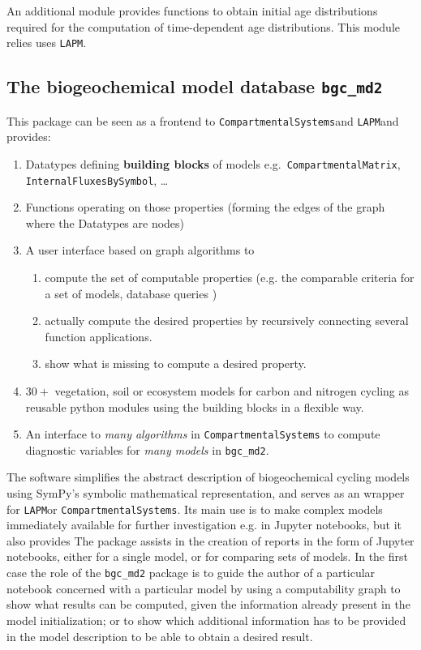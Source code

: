 \documentclass[a4paper]{article}
\newcommand{\LAPM}{\texttt{LAPM}}
\newcommand{\CompartmentalSystems}{\texttt{CompartmentalSystems}}
\begin{document}
An additional module provides functions to obtain initial age distributions
required for the computation of time-dependent age distributions. 
This module relies uses \LAPM.


\subsection{The biogeochemical model database \texttt{bgc\_md2}}
This package can be seen as a frontend to \CompartmentalSystems and \LAPM and
provides: 
  \begin{enumerate}
    \item
      Datatypes defining {\bf building blocks} of models e.g.\ \texttt{CompartmentalMatrix}, \texttt{InternalFluxesBySymbol}, \dots     
    \item
      Functions operating on those properties (forming the edges of the graph where the Datatypes are nodes) 
    \item
      A user interface based on graph algorithms to  
    \begin{enumerate}
      \item
        compute the set of computable properties (e.g. the comparable criteria for a set of models, database queries ) 
      \item
        actually compute the desired properties by recursively connecting several function applications.
      \item
        show what is missing to compute a desired property.
    \end{enumerate}
    \item
    $30+$ vegetation, soil or ecosystem models for carbon and nitrogen cycling
      as reusable python modules using the building blocks in a flexible way. 
    \item 
      An interface to \emph{many  algorithms} in \texttt{CompartmentalSystems} to compute diagnostic variables
      for \emph{many models} in \texttt{bgc\_md2}.
  \end{enumerate}
The software simplifies the abstract description of biogeochemical cycling
models using SymPy's symbolic mathematical representation, and serves as an
wrapper for \LAPM or \CompartmentalSystems.
Its main use is to make complex models immediately available for further investigation e.g. in Jupyter notebooks, but it also provides 
The package assists in the creation of reports in the form of Jupyter notebooks, either for a single model, or for comparing sets of models.
In the first case the role of the \texttt{bgc\_md2} package is to guide the author of a particular notebook concerned with a particular model by using a computability graph to show what results can be computed, given the information already present in the model initialization; or to show which additional information has to be provided in the model description to be able to obtain a desired result.
\end{document}
